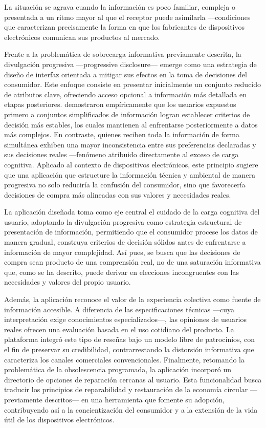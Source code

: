 La situación se agrava cuando la información es poco familiar, compleja o
presentada a un ritmo mayor al que el receptor puede asimilarla —condiciones que
caracterizan precisamente la forma en que los fabricantes de dispositivos
electrónicos comunican sus productos al mercado. 

Frente a la problemática de sobrecarga informativa previamente descrita, la
divulgación progresiva —progressive disclosure— emerge como una estrategia de
diseño de interfaz orientada a mitigar sus efectos en la toma de decisiones del
consumidor. Este enfoque consiste en presentar inicialmente un conjunto reducido
de atributos clave, ofreciendo acceso opcional a información más detallada en
etapas posteriores. \textcite[pp.~15-19]{hu2022} demostraron empíricamente que
los usuarios expuestos primero a conjuntos simplificados de información logran
establecer criterios de decisión más estables, los cuales mantienen al
enfrentarse posteriormente a datos más complejos. En contraste, quienes reciben
toda la información de forma simultánea exhiben una mayor inconsistencia entre
sus preferencias declaradas y sus decisiones reales —fenómeno atribuido
directamente al exceso de carga cognitiva. Aplicado al contexto de dispositivos
electrónicos, este principio sugiere que una aplicación que estructure la
información técnica y ambiental de manera progresiva no solo reduciría la
confusión del consumidor, sino que favorecería decisiones de compra más
alineadas con sus valores y necesidades reales.

La aplicación diseñada toma como eje central el cuidado de la carga cognitiva
del usuario, adoptando la divulgación progresiva como estrategia
estructural de presentación de información, permitiendo que el consumidor
procese los datos de manera gradual, construya criterios de decisión sólidos
antes de enfrentarse a información de mayor complejidad. Así pues, se busca
que las decisiones de compra sean producto de una comprensión real, no de una
saturación informativa que, como se ha descrito, puede derivar en elecciones
incongruentes con las necesidades y valores del propio usuario. 

Además, la aplicación reconoce el valor de la experiencia colectiva como fuente de
información accesible. A diferencia de las especificaciones técnicas
—cuya interpretación exige conocimientos especializados—, las opiniones de
usuarios reales ofrecen una evaluación basada en el uso cotidiano del producto.
La plataforma integró este tipo de reseñas bajo un modelo libre de
patrocinios, con el fin de preservar su credibilidad, contrarrestando la
distorsión informativa que caracteriza los canales comerciales convencionales.
Finalmente, retomando la problemática de la obsolescencia programada, la aplicación
incorporó un directorio de opciones de reparación cercanas al usuario. Esta
funcionalidad busca traducir los principios de reparabilidad y restauración de
la economía circular —previamente descritos— en una herramienta que
fomente su adopción, contribuyendo así a la concientización del consumidor y a
la extensión de la vida útil de los dispositivos electrónicos.